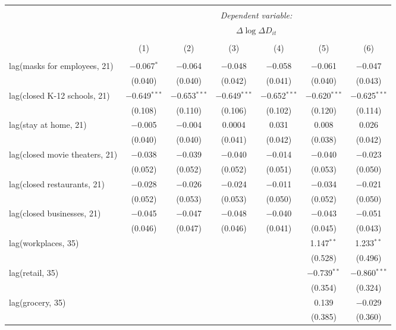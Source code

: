 \begin{tabular}{@{\extracolsep{1pt}}lcccccc} 
\\[-1.8ex]\hline 
\hline \\[-1.8ex] 
 & \multicolumn{6}{c}{\textit{Dependent variable:}} \\ 
\cline{2-7} 
 & \multicolumn{6}{c}{$\Delta \log \Delta D_{it}$} \\ 
\\[-1.8ex] & (1) & (2) & (3) & (4) & (5) & (6)\\ 
\hline \\[-1.8ex] 
 lag(masks for employees, 21) & $-$0.067$^{*}$ & $-$0.064 & $-$0.048 & $-$0.058 & $-$0.061 & $-$0.047 \\ 
  & (0.040) & (0.040) & (0.042) & (0.041) & (0.040) & (0.043) \\ 
  lag(closed K-12 schools, 21) & $-$0.649$^{***}$ & $-$0.653$^{***}$ & $-$0.649$^{***}$ & $-$0.652$^{***}$ & $-$0.620$^{***}$ & $-$0.625$^{***}$ \\ 
  & (0.108) & (0.110) & (0.106) & (0.102) & (0.120) & (0.114) \\ 
  lag(stay at home, 21) & $-$0.005 & $-$0.004 & 0.0004 & 0.031 & 0.008 & 0.026 \\ 
  & (0.040) & (0.040) & (0.041) & (0.042) & (0.038) & (0.042) \\ 
  lag(closed movie theaters, 21) & $-$0.038 & $-$0.039 & $-$0.040 & $-$0.014 & $-$0.040 & $-$0.023 \\ 
  & (0.052) & (0.052) & (0.052) & (0.051) & (0.053) & (0.050) \\ 
  lag(closed restaurants, 21) & $-$0.028 & $-$0.026 & $-$0.024 & $-$0.011 & $-$0.034 & $-$0.021 \\ 
  & (0.052) & (0.053) & (0.053) & (0.050) & (0.052) & (0.050) \\ 
  lag(closed businesses, 21) & $-$0.045 & $-$0.047 & $-$0.048 & $-$0.040 & $-$0.043 & $-$0.051 \\ 
  & (0.046) & (0.047) & (0.046) & (0.041) & (0.045) & (0.043) \\ 
  lag(workplaces, 35) &  &  &  &  & 1.147$^{**}$ & 1.233$^{**}$ \\ 
  &  &  &  &  & (0.528) & (0.496) \\ 
  lag(retail, 35) &  &  &  &  & $-$0.739$^{**}$ & $-$0.860$^{***}$ \\ 
  &  &  &  &  & (0.354) & (0.324) \\ 
  lag(grocery, 35) &  &  &  &  & 0.139 & $-$0.029 \\ 
  &  &  &  &  & (0.385) & (0.360) \\ 

\end{tabular}
